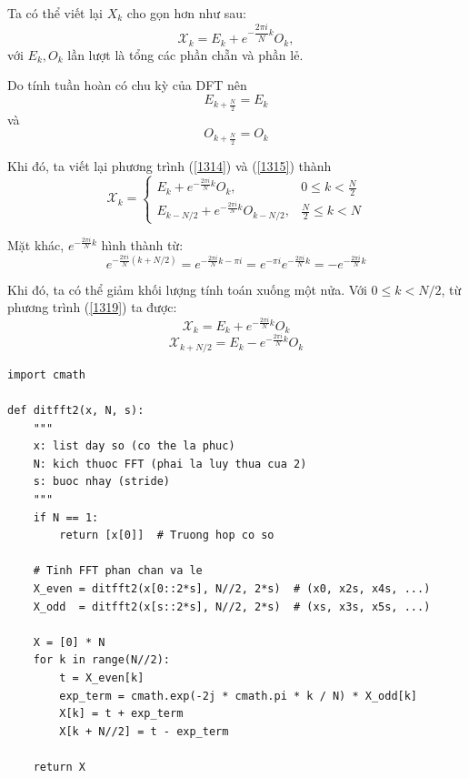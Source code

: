 \documentclass[12pt,a4paper]{report}
\numberwithin{equation}{section}
\theoremstyle{definition} %
\begin{document}
Ta có thể viết lại $X_k$ cho gọn hơn như sau: 
\begin{equation}
	\label{1316}
\mathcal{X}_k = E_k + e^{-\dfrac{2\pi i }{N}k}O_k,
\end{equation}
với $E_k, O_k$ lần lượt là tổng các phần chẵn và phần lẻ.

Do tính tuần hoàn có chu kỳ của DFT nên
\begin{equation}
    E_{k+\tfrac{N}{2}} = E_k
\end{equation}
và
\begin{equation}
    O_{k+\tfrac{N}{2}} = O_k
\end{equation}

Khi đó, ta viết lại phương trình (\ref{1314}) và (\ref{1315}) thành
\begin{equation}
	\label{1319}
    \mathcal{X}_k = 
    \begin{cases}
        E_k + e^{-\tfrac{2\pi i}{N}k} O_k, & 0 \leq k < \tfrac{N}{2} \\
        E_{k-N/2} + e^{-\tfrac{2\pi i}{N}k} O_{k-N/2}, & \tfrac{N}{2} \leq k < N
    \end{cases}
\end{equation}

Mặt khác, $e^{-\tfrac{2\pi i}{N}k}$ hình thành từ:
\begin{equation*}
    e^{-\tfrac{2\pi i}{N}(k+N/2)} 
    = e^{-\tfrac{2\pi i}{N}k - \pi i} 
    = e^{-\pi i} e^{-\tfrac{2\pi i}{N}k} 
    = -e^{-\tfrac{2\pi i}{N}k}
\end{equation*}

Khi đó, ta có thể giảm khối lượng tính toán xuống một nửa. Với $0 \leq k < N/2$, từ phương trình (\ref{1319}) ta được:
\begin{equation}
    \mathcal{X}_k = E_k + e^{-\tfrac{2\pi i}{N}k} O_k
\end{equation}
\begin{equation}
    \mathcal{X}_{k+N/2} = E_k - e^{-\tfrac{2\pi i}{N}k} O_k
\end{equation}


\begin{lstlisting}[caption={Thuật toán FFT đệ quy dạng ditfft2}, label={code:fft}]
import cmath

def ditfft2(x, N, s):
    """
    x: list day so (co the la phuc)
    N: kich thuoc FFT (phai la luy thua cua 2)
    s: buoc nhay (stride)
    """
    if N == 1:
        return [x[0]]  # Truong hop co so
    
    # Tinh FFT phan chan va le
    X_even = ditfft2(x[0::2*s], N//2, 2*s)  # (x0, x2s, x4s, ...)
    X_odd  = ditfft2(x[s::2*s], N//2, 2*s)  # (xs, x3s, x5s, ...)
    
    X = [0] * N
    for k in range(N//2):
        t = X_even[k]
        exp_term = cmath.exp(-2j * cmath.pi * k / N) * X_odd[k]
        X[k] = t + exp_term
        X[k + N//2] = t - exp_term
    
    return X
\end{lstlisting}
\end{document}
